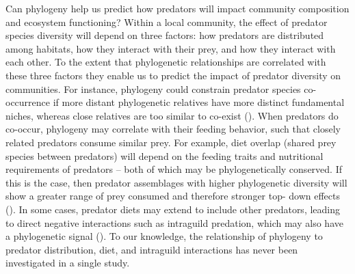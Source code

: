 \documentclass[11pt]{article}
\begin{document}
Can
phylogeny help us predict how predators will impact community composition and ecosystem functioning? Within a local community, the effect of predator species diversity will
depend on three factors: how predators are distributed among habitats,
how they interact with their prey, and how they interact with each other. To the extent that phylogenetic relationships are
correlated with these three factors they enable us to predict the impact
of predator diversity on communities. For instance, phylogeny could
constrain predator species co-occurrence if more distant phylogenetic
relatives have more distinct fundamental niches, whereas close relatives
are too similar to co-exist (\citealt{Webb2002, Emerson2008}). When
predators do co-occur, phylogeny may correlate with their feeding
behavior, such that closely related predators consume similar prey. For
example, diet overlap (shared prey species between predators) will
depend on the feeding traits and nutritional requirements of predators
-- both of which may be phylogenetically conserved. If this is the case,
then predator assemblages with higher phylogenetic diversity will show a
greater range of prey consumed and therefore stronger top- down effects
(\citealt{Finke2008a}). In some cases, predator diets may extend to include
other predators, leading to direct negative interactions such as
intraguild predation, which may also have a phylogenetic signal
(\citealt{Pfennig2000}). To our knowledge, the relationship of phylogeny to
predator distribution, diet, and intraguild interactions has never been
investigated in a single study.
\end{document}
